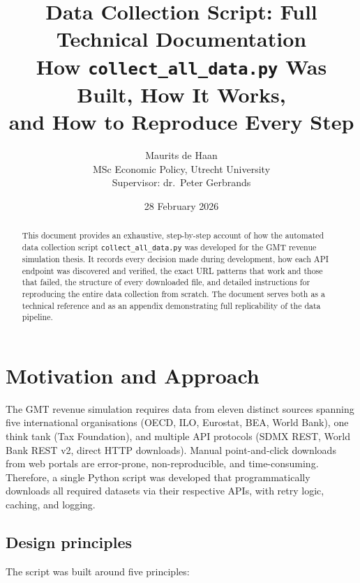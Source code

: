 \documentclass[12pt,a4paper]{article}
\title{%
  \textbf{Data Collection Script: Full Technical Documentation}\\[0.5em]
  \large How \texttt{collect\_all\_data.py} Was Built, How It Works,\\
  and How to Reproduce Every Step%
}
\author{%
  Maurits de Haan\\
  \small MSc Economic Policy, Utrecht University\\
  \small Supervisor: dr.\ Peter Gerbrands%
}
\date{28 February 2026}
\begin{document}
\maketitle

\begin{abstract}
This document provides an exhaustive, step-by-step account of how the automated data collection script \texttt{collect\_all\_data.py} was developed for the GMT revenue simulation thesis.
It records every decision made during development, how each API endpoint was discovered and verified, the exact URL patterns that work and those that failed, the structure of every downloaded file, and detailed instructions for reproducing the entire data collection from scratch.
The document serves both as a technical reference and as an appendix demonstrating full replicability of the data pipeline.
\end{abstract}

\newpage
\tableofcontents
\newpage


\section{Motivation and Approach}\label{sec:motivation}

The GMT revenue simulation requires data from eleven distinct sources spanning five international organisations (OECD, ILO, Eurostat, BEA, World Bank), one think tank (Tax Foundation), and multiple API protocols (SDMX REST, World Bank REST v2, direct HTTP downloads).
Manual point-and-click downloads from web portals are error-prone, non-reproducible, and time-consuming.
Therefore, a single Python script was developed that programmatically downloads all required datasets via their respective APIs, with retry logic, caching, and logging.

\subsection{Design principles}

The script was built around five principles:
\end{document}

